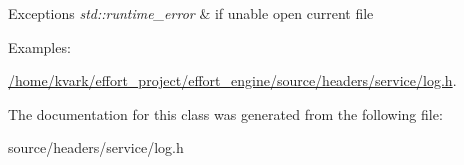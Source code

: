 \begin{DoxyExceptions}{Exceptions}
{\em std\+::runtime\+\_\+error} & if unable open current file \\
\hline
\end{DoxyExceptions}
\begin{Desc}
\item[Examples\+: ]\par
\mbox{\hyperlink{_2home_2kvark_2effort_project_2effort_engine_2source_2headers_2service_2log_8h-example}{/home/kvark/effort\+\_\+project/effort\+\_\+engine/source/headers/service/log.\+h}}.\end{Desc}


The documentation for this class was generated from the following file\+:\begin{DoxyCompactItemize}
\item 
source/headers/service/log.\+h\end{DoxyCompactItemize}
